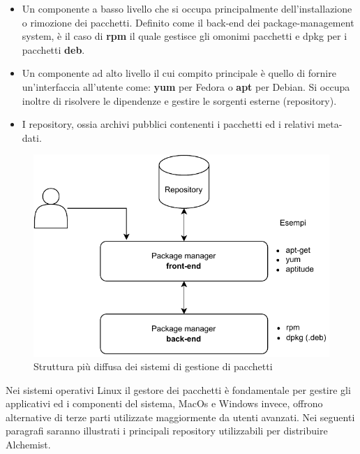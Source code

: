 \begin{itemize}
	\item Un componente a basso livello che si occupa principalmente dell'installazione o rimozione dei pacchetti. Definito come il back-end dei package-management system, è il caso di \textbf{rpm} il quale gestisce gli omonimi pacchetti e dpkg per i pacchetti \textbf{deb}.
	\item Un componente ad alto livello il cui compito principale è quello di fornire un'interfaccia all'utente come: \textbf{yum} per Fedora o \textbf{apt} per Debian. Si occupa inoltre di risolvere le dipendenze e gestire le sorgenti esterne (repository).
	\item I repository, ossia archivi pubblici contenenti i pacchetti ed i relativi meta-dati.
\end{itemize}

\begin{figure}[H]
	\centering
	\includegraphics[width=.7\linewidth]{figures/package-managers.pdf}
	\caption{Struttura più diffusa dei sistemi di gestione di pacchetti}
	\label{fig:package-managers}
\end{figure}

Nei sistemi operativi Linux il gestore dei pacchetti è fondamentale per gestire gli applicativi ed i componenti del sistema, MacOs e Windows invece, offrono alternative di terze parti utilizzate maggiormente da utenti avanzati. Nei seguenti paragrafi saranno illustrati i principali repository utilizzabili per distribuire Alchemist.

